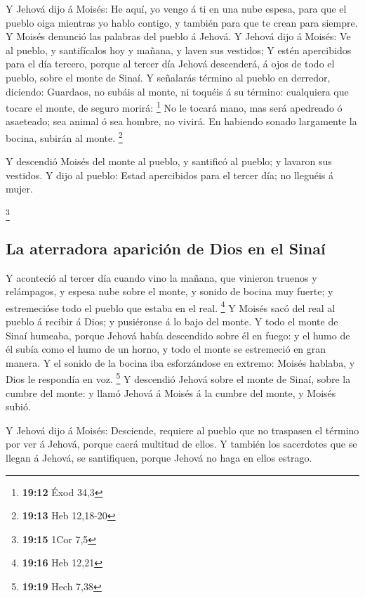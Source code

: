  Y Jehová dijo á Moisés: He aquí, yo vengo á ti en una
nube espesa, para que el pueblo oiga mientras yo hablo contigo, y
también para que te crean para siempre. Y Moisés denunció las palabras
del pueblo á Jehová.  Y Jehová dijo á Moisés: Ve al
pueblo, y santifícalos hoy y mañana, y laven sus vestidos;
 Y estén apercibidos para el día tercero, porque al
tercer día Jehová descenderá, á ojos de todo el pueblo, sobre el monte
de Sinaí.  Y señalarás término al pueblo en derredor,
diciendo: Guardaos, no subáis al monte, ni toquéis á su término:
cualquiera que tocare el monte, de seguro morirá: \footnote{\textbf{19:12}
  Éxod 34,3}  No le tocará mano, mas será apedreado ó
asaeteado; sea animal ó sea hombre, no vivirá. En habiendo sonado
largamente la bocina, subirán al monte. \footnote{\textbf{19:13} Heb
  12,18-20}

 Y descendió Moisés del monte al pueblo, y santificó al
pueblo; y lavaron sus vestidos.  Y dijo al pueblo: Estad
apercibidos para el tercer día; no lleguéis á mujer.

\footnote{\textbf{19:15} 1Cor 7,5}

\hypertarget{la-aterradora-apariciuxf3n-de-dios-en-el-sinauxed}{%
\subsection{La aterradora aparición de Dios en el
Sinaí}\label{la-aterradora-apariciuxf3n-de-dios-en-el-sinauxed}}

 Y aconteció al tercer día cuando vino la mañana, que
vinieron truenos y relámpagos, y espesa nube sobre el monte, y sonido de
bocina muy fuerte; y estremecióse todo el pueblo que estaba en el real.
\footnote{\textbf{19:16} Heb 12,21}  Y Moisés sacó del
real al pueblo á recibir á Dios; y pusiéronse á lo bajo del monte.
 Y todo el monte de Sinaí humeaba, porque Jehová había
descendido sobre él en fuego: y el humo de él subía como el humo de un
horno, y todo el monte se estremeció en gran manera.  Y
el sonido de la bocina iba esforzándose en extremo: Moisés hablaba, y
Dios le respondía en voz. \footnote{\textbf{19:19} Hech 7,38}
 Y descendió Jehová sobre el monte de Sinaí, sobre la
cumbre del monte: y llamó Jehová á Moisés á la cumbre del monte, y
Moisés subió.

 Y Jehová dijo á Moisés: Desciende, requiere al pueblo
que no traspasen el término por ver á Jehová, porque caerá multitud de
ellos.  Y también los sacerdotes que se llegan á Jehová,
se santifiquen, porque Jehová no haga en ellos estrago.

